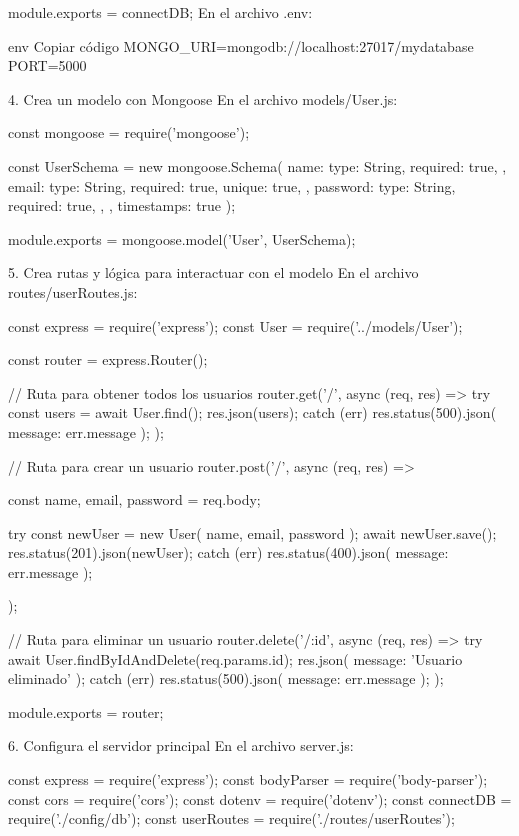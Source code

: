 module.exports = connectDB;
En el archivo .env:

env
Copiar código
MONGO_URI=mongodb://localhost:27017/mydatabase
PORT=5000




4. Crea un modelo con Mongoose
En el archivo models/User.js:

const mongoose = require('mongoose');

const UserSchema = new mongoose.Schema({
  name: {
    type: String,
    required: true,
  },
  email: {
    type: String,
    required: true,
    unique: true,
  },
  password: {
    type: String,
    required: true,
  },
}, { timestamps: true });

module.exports = mongoose.model('User', UserSchema);




5. Crea rutas y lógica para interactuar con el modelo
En el archivo routes/userRoutes.js:

const express = require('express');
const User = require('../models/User');

const router = express.Router();

// Ruta para obtener todos los usuarios
router.get('/', async (req, res) => {
  try {
    const users = await User.find();
    res.json(users);
  } catch (err) {
    res.status(500).json({ message: err.message });
  }
});

// Ruta para crear un usuario
router.post('/', async (req, res) => {
  const { name, email, password } = req.body;

  try {
    const newUser = new User({ name, email, password });
    await newUser.save();
    res.status(201).json(newUser);
  } catch (err) {
    res.status(400).json({ message: err.message });
  }
});

// Ruta para eliminar un usuario
router.delete('/:id', async (req, res) => {
  try {
    await User.findByIdAndDelete(req.params.id);
    res.json({ message: 'Usuario eliminado' });
  } catch (err) {
    res.status(500).json({ message: err.message });
  }
});

module.exports = router;




6. Configura el servidor principal
En el archivo server.js:


const express = require('express');
const bodyParser = require('body-parser');
const cors = require('cors');
const dotenv = require('dotenv');
const connectDB = require('./config/db');
const userRoutes = require('./routes/userRoutes');

